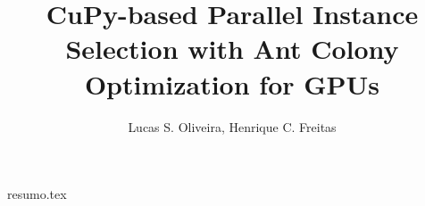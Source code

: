 \documentclass[12pt]{article}
\title{CuPy-based Parallel Instance Selection with Ant Colony Optimization for GPUs}
\author{{Lucas S. Oliveira\inst{1}, Henrique C. Freitas\inst{1}}}
\begin{document}
 

\maketitle

{resumo.tex}
\end{document}
